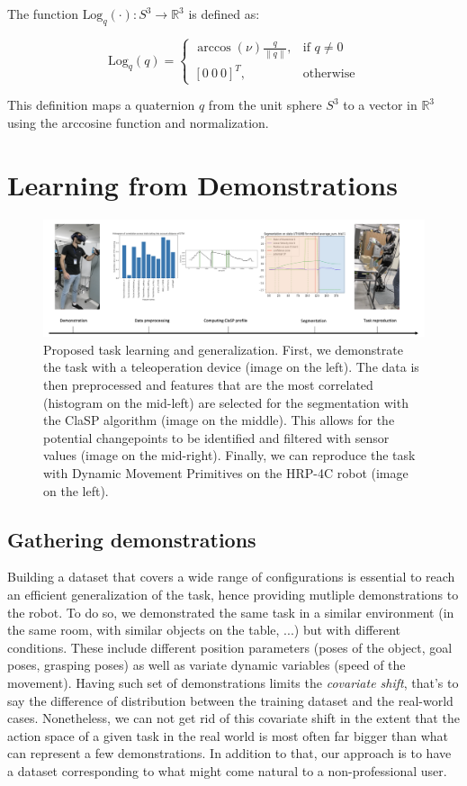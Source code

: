 \documentclass[conference]{IEEEtran}
\begin{document}
The function \(\text{Log}_q(\cdot) : S^3 \rightarrow \mathbb{R}^3\) is defined as:

\[
\text{Log}_q(q) = \begin{cases}
\arccos(\nu) \frac{q}{\|q\|}, & \text{if } q \neq 0 \\
[0 \ 0 \ 0]^T, & \text{otherwise}
\end{cases}
\]

This definition maps a quaternion \(q\) from the unit sphere \(S^3\) to a vector in \(\mathbb{R}^3\) using the arccosine function and normalization. 

\section{Learning from Demonstrations} \label{LfD}

\begin{figure}[t]
  \centering
       \includegraphics[width=\linewidth]{img/framework.png}
       \caption{Proposed task learning and generalization. First, we demonstrate the task with a teleoperation device (image on the left). The data is then preprocessed and features that are the most correlated (histogram on the mid-left) are selected for the segmentation with the ClaSP algorithm (image on the middle). This allows for the potential changepoints to be identified and filtered with sensor values (image on the mid-right). Finally, we can reproduce the task with Dynamic Movement Primitives on the HRP-4C robot (image on the left).}
     \label{fig:framework}
\end{figure}

\subsection{Gathering demonstrations}


Building a dataset that covers a wide range of configurations is essential to reach an efficient generalization of the task, hence providing mutliple demonstrations to the robot. To do so, we demonstrated the same task in a similar environment (in the same room, with similar objects on the table, ...) but with different conditions. These include different position parameters (poses of the object, goal poses, grasping poses) as well as variate dynamic variables (speed of the movement). Having such set of demonstrations limits the \textit{covariate  shift}, that's to say the difference of distribution between the training dataset and the real-world cases. Nonetheless, we can not get rid of  this covariate shift in the extent that the action space of a given task in the real world is most often far bigger than what can represent a few demonstrations. In addition to that, our approach is to have a dataset corresponding to what might come natural to a non-professional user.
\end{document}

